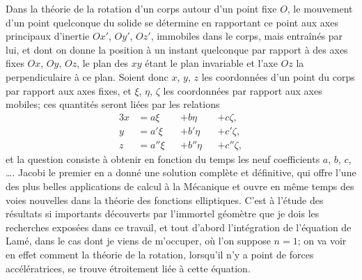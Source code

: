 \documentclass[11pt,leqno,oneside,letterpaper]{book}[2005/09/16]
\begin{document}
Dans la th\'eorie de la rotation d'un corps autour d'un point
fixe $O$, le mouvement d'un point quelconque du solide se d\'etermine en
rapportant ce point aux axes principaux d'inertie $Ox'$, $Oy'$, $Oz'$, immobiles
dans le corps, mais entra\^in\'es par lui, et dont on donne la position
\`a un instant quelconque par rapport \`a des axes fixes $Ox$, $Oy$, $Oz$, le plan
des $xy$ \'etant le plan invariable et l'axe $Oz$ la perpendiculaire \`a ce plan.
Soient donc $x$, $y$, $z$ les coordonn\'ees d'un point du corps par rapport aux
axes fixes, et $\xi$, $\eta$, $\zeta$ les coordonn\'ees par rapport aux axes mobiles; ces
quantit\'es seront li\'ees par les relations\label{page23}
\begin{alignat*}{3}
  x &= a  \xi &&+ b  \eta &&+ c  \zeta,\\
  y &= a' \xi &&+ b' \eta &&+ c' \zeta,\\
  z &= a''\xi &&+ b''\eta &&+ c''\zeta,
\end{alignat*}
et la question consiste \`a obtenir en fonction du temps les neuf coefficients
$a$, $b$, $c$, \ldots. Jacobi le premier en a donn\'e une solution compl\`ete et d\'efinitive,
qui offre l'une des plus belles applications de calcul \`a la M\'ecanique
et ouvre en m\^eme temps des voies nouvelles dans la th\'eorie des fonctions elliptiques.
C'est \`a l'\'etude des r\'esultats si importants d\'ecouverts par l'immortel
g\'eom\`etre que je dois les recherches expos\'ees dans ce travail, et tout
d'abord l'int\'egration de l'\'equation de Lam\'e, dans le cas dont je viens de
m'occuper, o\`u l'on suppose $n = 1$; on va voir en effet comment la th\'eorie
de la rotation, lorsqu'il n'y a point de forces acc\'el\'eratrices, se trouve
\'etroitement li\'ee \`a cette \'equation.
\end{document}
